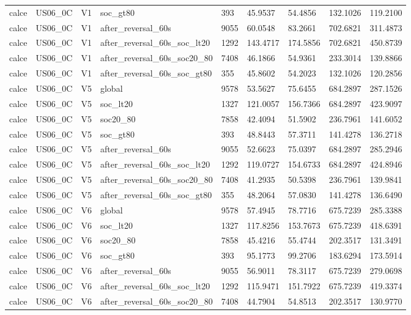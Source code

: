 \begin{tabular}{lllllllll}
calce & US06\_0C & V1 & soc\_gt80 & 393 & 45.9537 & 54.4856 & 132.1026 & 119.2100 \\
calce & US06\_0C & V1 & after\_reversal\_60s & 9055 & 60.0548 & 83.2661 & 702.6821 & 311.4873 \\
calce & US06\_0C & V1 & after\_reversal\_60s\_soc\_lt20 & 1292 & 143.4717 & 174.5856 & 702.6821 & 450.8739 \\
calce & US06\_0C & V1 & after\_reversal\_60s\_soc20\_80 & 7408 & 46.1866 & 54.9361 & 233.3014 & 139.8866 \\
calce & US06\_0C & V1 & after\_reversal\_60s\_soc\_gt80 & 355 & 45.8602 & 54.2023 & 132.1026 & 120.2856 \\
calce & US06\_0C & V5 & global & 9578 & 53.5627 & 75.6455 & 684.2897 & 287.1526 \\
calce & US06\_0C & V5 & soc\_lt20 & 1327 & 121.0057 & 156.7366 & 684.2897 & 423.9097 \\
calce & US06\_0C & V5 & soc20\_80 & 7858 & 42.4094 & 51.5902 & 236.7961 & 141.6052 \\
calce & US06\_0C & V5 & soc\_gt80 & 393 & 48.8443 & 57.3711 & 141.4278 & 136.2718 \\
calce & US06\_0C & V5 & after\_reversal\_60s & 9055 & 52.6623 & 75.0397 & 684.2897 & 285.2946 \\
calce & US06\_0C & V5 & after\_reversal\_60s\_soc\_lt20 & 1292 & 119.0727 & 154.6733 & 684.2897 & 424.8946 \\
calce & US06\_0C & V5 & after\_reversal\_60s\_soc20\_80 & 7408 & 41.2935 & 50.5398 & 236.7961 & 139.9841 \\
calce & US06\_0C & V5 & after\_reversal\_60s\_soc\_gt80 & 355 & 48.2064 & 57.0830 & 141.4278 & 136.6490 \\
calce & US06\_0C & V6 & global & 9578 & 57.4945 & 78.7716 & 675.7239 & 285.3388 \\
calce & US06\_0C & V6 & soc\_lt20 & 1327 & 117.8256 & 153.7673 & 675.7239 & 418.6391 \\
calce & US06\_0C & V6 & soc20\_80 & 7858 & 45.4216 & 55.4744 & 202.3517 & 131.3491 \\
calce & US06\_0C & V6 & soc\_gt80 & 393 & 95.1773 & 99.2706 & 183.6294 & 173.5914 \\
calce & US06\_0C & V6 & after\_reversal\_60s & 9055 & 56.9011 & 78.3117 & 675.7239 & 279.0698 \\
calce & US06\_0C & V6 & after\_reversal\_60s\_soc\_lt20 & 1292 & 115.9471 & 151.7922 & 675.7239 & 419.3374 \\
calce & US06\_0C & V6 & after\_reversal\_60s\_soc20\_80 & 7408 & 44.7904 & 54.8513 & 202.3517 & 130.9770 \\

\end{tabular}
